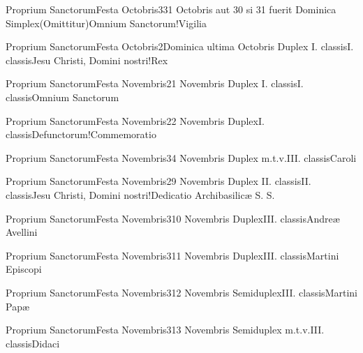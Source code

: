 \documentclass[psalterium-feriale.tex]{subfiles}
\begin{document}
	{Proprium Sanctorum}{Festa Octobris}{3}{31 Octobris aut 30 si 31 fuerit Dominica}
	{Simplex}{(Omittitur)}{Omnium Sanctorum!Vigilia}
	{}
	{}
\invitferia

	{Proprium Sanctorum}{Festa Octobris}{2}{Dominica ultima Octobris}
	{Duplex I. classis}{I. classis}{Jesu Christi, Domini nostri!Rex}
	{}
	{}
\psalmodiapropria

	{Proprium Sanctorum}{Festa Novembris}{2}{1 Novembris}
	{Duplex I. classis}{I. classis}{Omnium Sanctorum}
	{}
	{}
\psalmodiapropria
{}

	{Proprium Sanctorum}{Festa Novembris}{2}{2 Novembris}
	{Duplex}{I. classis}{Defunctorum!Commemoratio}
	{}
	{}
\psalmodiapropria

	{Proprium Sanctorum}{Festa Novembris}{3}{4 Novembris}
	{Duplex m.t.v.}{III. classis}{Caroli}
	{}
	{}

	{Proprium Sanctorum}{Festa Novembris}{2}{9 Novembris}
	{Duplex II. classis}{II. classis}{Jesu Christi, Domini nostri!Dedicatio Archibasilicæ S. S.\linebreak\null}
	{}
	{}
\psalmodiapropria

	{Proprium Sanctorum}{Festa Novembris}{3}{10 Novembris}
	{Duplex}{III. classis}{Andreæ Avellini}
	{}
	{}

	{Proprium Sanctorum}{Festa Novembris}{3}{11 Novembris}
	{Duplex}{III. classis}{Martini Episcopi}
	{}
	{}
\psalmodiapropria

	{Proprium Sanctorum}{Festa Novembris}{3}{12 Novembris}
	{Semiduplex}{III. classis}{Martini Papæ}
	{}
	{}

	{Proprium Sanctorum}{Festa Novembris}{3}{13 Novembris}
	{Semiduplex m.t.v.}{III. classis}{Didaci}
	{}
	{}
\end{document}
